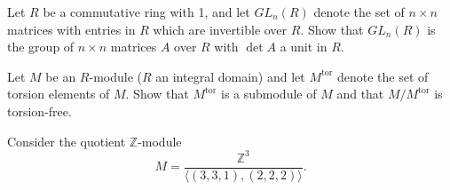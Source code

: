 \documentclass[answers]{exam}
\begin{document}
\begin{questions}



\question%
Let $R$ be a commutative ring with 1, and let $GL_{n}(R)$ denote the set of $n \times n$ matrices with entries in $R$ which are invertible over $R$. Show that $GL_{n}(R)$ is the group of $n \times n$ matrices $A$ over $R$ with $\det A$ a unit in $R$.



\question%



\question%
Let $M$ be an $R$-module ($R$ an integral domain) and let $M^{\mathrm{tor}}$ denote the set of torsion elements of $M$. Show that $M^{\mathrm{tor}}$ is a submodule of $M$ and that $M / M^{\mathrm{tor}}$ is torsion-free.



\question%
Consider the quotient $\mathbb{Z}$-module \[
	M=\frac{\mathbb{Z}^{3}}{\langle(3,3,1),(2,2,2)\rangle}.
\]
\end{questions}
\end{document}
